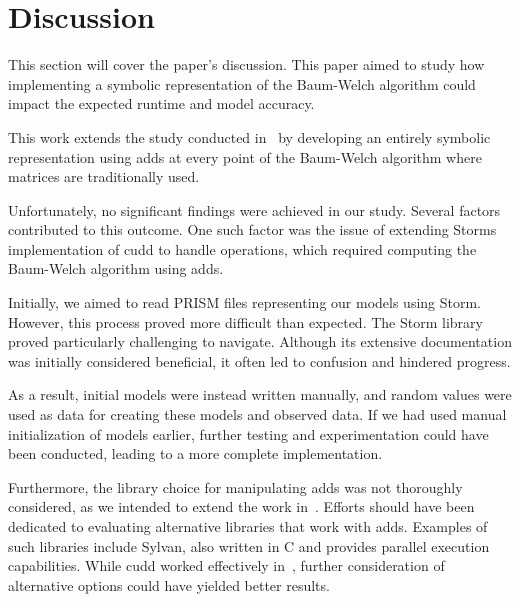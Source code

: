 

\section{Discussion}\label{sec:discussion}
This section will cover the paper's discussion. 
This paper aimed to study how implementing a symbolic representation of the Baum-Welch algorithm could impact the expected runtime and model accuracy. 

This work extends the study conducted in~\cite{p7} by developing an entirely symbolic representation using \glspl{add} at every point of the Baum-Welch algorithm where matrices are traditionally used.

Unfortunately, no significant findings were achieved in our study. Several factors contributed to this outcome. 
One such factor was the issue of extending Storms implementation of \gls{cudd} to handle operations, which required computing the Baum-Welch algorithm using \glspl{add}. 

Initially, we aimed to read PRISM files representing our models using Storm. 
However, this process proved more difficult than expected. 
The Storm library proved particularly challenging to navigate. 
Although its extensive documentation was initially considered beneficial, it often led to confusion and hindered progress. 

As a result, initial models were instead written manually, and random values were used as data for creating these models and observed data. 
If we had used manual initialization of models earlier, further testing and experimentation could have been conducted, leading to a more complete implementation.

Furthermore, the library choice for manipulating \glspl{add} was not thoroughly considered, as we intended to extend the work in~\cite{p7}.
Efforts should have been dedicated to evaluating alternative libraries that work with \glspl{add}. 
Examples of such libraries include Sylvan, also written in C and provides parallel execution capabilities. 
While \gls{cudd} worked effectively in~\cite{p7}, further consideration of alternative options could have yielded better results.

